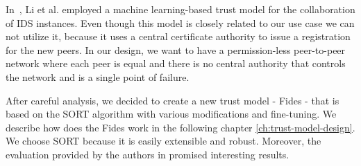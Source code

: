 In~\cite{li2014design}, Li et al. employed a machine learning-based trust model for the collaboration of IDS instances.
Even though this model is closely related to our use case we can not utilize it, because it uses a central certificate authority to issue a registration for the new peers. 
In our design, we want to have a permission-less peer-to-peer network where each peer is equal and there is no central authority that controls the network and is a single point of failure.

\vspace{1cm}

\noindent
After careful analysis, we decided to create a new trust model - Fides - that is based on the SORT algorithm with various modifications and fine-tuning.
We describe how does the Fides work in the following chapter \ref{ch:trust-model-design}.
We choose SORT because it is easily extensible and robust. 
Moreover, the evaluation provided by the authors in \cite{sort} promised interesting results.